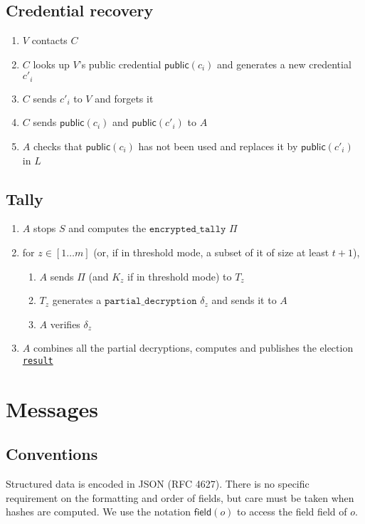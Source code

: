 \documentclass[a4paper]{article}
\newcommand{\public}{\textsf{public}}
\newcommand{\etally}{\texttt{encrypted\_tally}}
\newcommand{\pdecryption}{\texttt{partial\_decryption}}
\newcommand{\result}{\texttt{result}}
\begin{document}
\subsection{Credential recovery}

\begin{enumerate}
\item $V$ contacts $C$
\item $C$ looks up $V$'s public credential $\public(c_i)$ and
  generates a new credential $c'_i$
\item $C$ sends $c'_i$ to $V$ and forgets it
\item $C$ sends $\public(c_i)$ and $\public(c'_i)$ to $A$
\item $A$ checks that $\public(c_i)$ has not been used and replaces it
  by $\public(c'_i)$ in $L$
\end{enumerate}

\subsection{Tally}

\begin{enumerate}
\item $A$ stops $S$ and computes the \hyperref[tally]{$\etally$} $\Pi$
\item for $z\in[1\dots m]$ (or, if in threshold mode, a subset of it
  of size at least $t+1$),
  \begin{enumerate}
  \item $A$ sends $\Pi$ (and $K_z$ if in threshold mode) to $T_z$
  \item $T_z$ generates a \hyperref[tally]{$\pdecryption$} $\delta_z$
    and sends it to $A$
  \item $A$ verifies $\delta_z$
  \end{enumerate}
\item $A$ combines all the partial decryptions, computes and publishes
  the election \hyperref[election-result]{\result}
\end{enumerate}

\section{Messages}
\label{messages}

\subsection{Conventions}

Structured data is encoded in JSON (RFC 4627). There is no specific
requirement on the formatting and order of fields, but care must be
taken when hashes are computed. We use the notation
$\textsf{field}(o)$ to access the field \textsf{field} of $o$.
\end{document}
